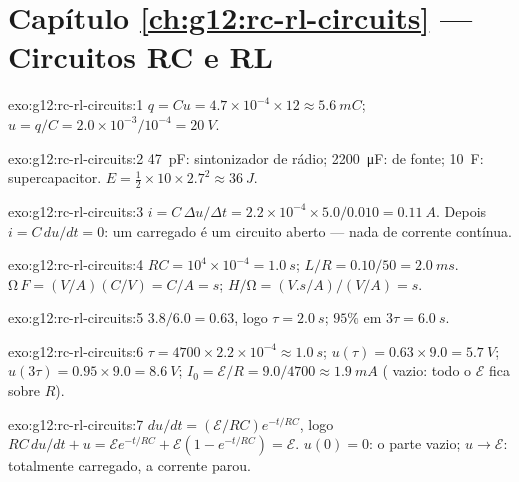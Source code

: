 \section*{Capítulo \ref{ch:g12:rc-rl-circuits} --- Circuitos RC e RL}

\begin{solution}{exo:g12:rc-rl-circuits:1}
$q = Cu = 4.7\times10^{-4} \times 12 \approx \qty{5.6}{mC}$;
$u = q/C = 2.0\times10^{-3}/10^{-4} = \qty{20}{V}$.
\end{solution}

\begin{solution}{exo:g12:rc-rl-circuits:2}
\qty{47}{pF}: sintonizador de rádio; \qty{2200}{\micro F}:  de
fonte; \qty{10}{F}: supercapacitor.
$E = \tfrac12 \times 10 \times 2.7^2 \approx \qty{36}{J}$.
\end{solution}

\begin{solution}{exo:g12:rc-rl-circuits:3}
$i = C\,\Delta u/\Delta t = 2.2\times10^{-4} \times 5.0/0.010 =
\qty{0.11}{A}$. Depois $i = C\,du/dt = 0$: um  carregado é um
circuito aberto --- nada de corrente contínua.
\end{solution}

\begin{solution}{exo:g12:rc-rl-circuits:4}
$RC = 10^4 \times 10^{-4} = \qty{1.0}{s}$;
$L/R = 0.10/50 = \qty{2.0}{ms}$. $\unit{\ohm}\,\unit{F} =
(\unit{V/A})(\unit{C/V}) = \unit{C/A} = \unit{s}$;
$\unit{H}/\unit{\ohm} = (\unit{V.s/A})/(\unit{V/A}) = \unit{s}$.
\end{solution}

\begin{solution}{exo:g12:rc-rl-circuits:5}
$3.8/6.0 = 0.63$, logo $\tau = \qty{2.0}{s}$; $95\%$ em
$3\tau = \qty{6.0}{s}$.
\end{solution}

\begin{solution}{exo:g12:rc-rl-circuits:6}
$\tau = 4700 \times 2.2\times10^{-4} \approx \qty{1.0}{s}$;
$u(\tau) = 0.63 \times 9.0 = \qty{5.7}{V}$;
$u(3\tau) = 0.95 \times 9.0 = \qty{8.6}{V}$;
$I_0 = \mathcal{E}/R = 9.0/4700 \approx \qty{1.9}{mA}$ ( vazio:
todo o $\mathcal{E}$ fica sobre $R$).
\end{solution}

\begin{solution}{exo:g12:rc-rl-circuits:7}
$du/dt = (\mathcal{E}/RC)e^{-t/RC}$, logo
$RC\,du/dt + u = \mathcal{E}e^{-t/RC} + \mathcal{E}(1 - e^{-t/RC}) =
\mathcal{E}$. $u(0) = 0$: o  parte vazio;
$u \to \mathcal{E}$: totalmente carregado, a corrente parou.
\end{solution}

